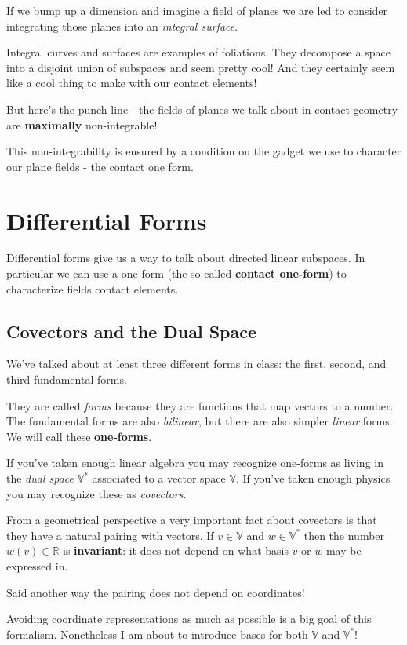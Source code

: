 \documentclass{article}
\begin{document}
If we bump up a dimension and imagine a field of planes we are led to consider
integrating those planes into an \textit{integral surface}.

Integral curves and surfaces are examples of foliations. They decompose a space
into a disjoint union of subspaces and seem pretty cool! And they certainly seem
like a cool thing to make with our contact elements!

But here's the punch line - the fields of planes we talk about in contact
geometry are \textbf{maximally} non-integrable!

This non-integrability is ensured by a condition on the gadget we use to
character our plane fields - the contact one form.

\section {Differential Forms}

Differential forms give us a way to talk about directed linear subspaces. In
particular we can use a one-form (the so-called \textbf{contact one-form}) to
characterize fields contact elements.

\subsection{Covectors and the Dual Space}
We've talked about at least three different forms in class: the first, second,
and third fundamental forms.

They are called \textit{forms} because they are functions that map vectors to a
number. The fundamental forms are also \textit{bilinear}, but there are also simpler
\textit{linear} forms. We will call these \textbf{one-forms}.

If you've taken enough linear algebra you may recognize one-forms as living in
the \textit{dual space} $\mathbb{V}^{*}$ associated to a vector space
$\mathbb{V}$. If you've taken enough physics you may recognize these as \textit{covectors}.

From a geometrical perspective a very important fact about covectors is that
they have a natural pairing with vectors. If $v \in \mathbb{V}$ and $w \in \mathbb{V}^{*}$ then the number $w(v) \in
\mathbb{R}$ is \textbf{invariant}: it does not depend on what basis $v$ or $w$
may be expressed in.

Said another way the pairing does not depend on coordinates!

Avoiding coordinate representations as much as possible is a big goal of this
formalism. Nonetheless I am about to introduce bases for both $\mathbb{V}$ and $\mathbb{V}^{*}$!
\end{document}
